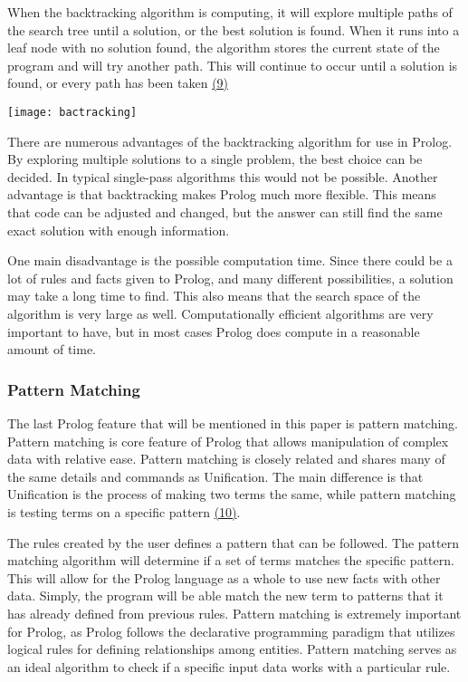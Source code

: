 \documentclass{article}
\theoremstyle{theorem}
\theoremstyle{definition}
\theoremstyle{remark}
\begin{document}
\noindent\newline When the backtracking algorithm is computing, it will explore multiple paths of the search tree until a solution, or the best solution is found. When it runs into a leaf node with no solution found, the algorithm stores the current state of the program and will try another path. This will continue to occur until a solution is found, or every path has been taken \href{https://www.simplilearn.com/tutorials/data-structure-tutorial/backtracking-algorithm}{(9)}

\texttt{[image: bactracking]}\noindent\newline

\noindent\newline There are numerous advantages of the backtracking algorithm for use in Prolog. By exploring multiple solutions to a single problem, the best choice can be decided. In typical single-pass algorithms this would not be possible. Another advantage is that backtracking makes Prolog much more flexible. This means that code can be adjusted and changed, but the answer can still find the same exact solution with enough information. 

\noindent\newline One main disadvantage is the possible computation time. Since there could be a lot of rules and facts given to Prolog, and many different possibilities, a solution may take a long time to find. This also means that the search space of the algorithm is very large as well. Computationally efficient algorithms are very important to have, but in most cases Prolog does compute in a reasonable amount of time.


\subsubsection{Pattern Matching}
\noindent\newline The last Prolog feature that will be mentioned in this paper is pattern matching. Pattern matching is core feature of Prolog that allows manipulation of complex data with relative ease. Pattern matching is closely related and shares many of the same details and commands as Unification. The main difference is that Unification is the process of making two terms the same, while pattern matching is testing terms on a specific pattern \href{https://composingprograms.com/pages/45-unification.html}{(10)}. 

\noindent\newline The rules created by the user defines a pattern that can be followed. The pattern matching algorithm will determine if a set of terms matches the specific pattern. This will allow for the Prolog language as a whole to use new facts with other data. Simply, the program will be able match the new term to patterns that it has already defined from previous rules. Pattern matching is extremely important for Prolog, as Prolog follows the declarative programming paradigm that utilizes logical rules for defining relationships among entities. Pattern matching serves as an ideal algorithm to check if a specific input data works with a particular rule.
\end{document}
